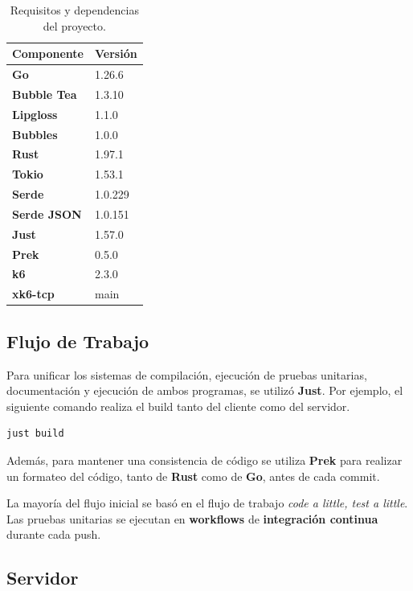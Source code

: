 \begin{table}[h]
    \centering
    \begin{tabular}{ll}
        \textbf{Componente} & \textbf{Versión} \\ \hline
        \textbf{Go} & 1.26.6 \\
        \textbf{Bubble Tea} & 1.3.10 \\
        \textbf{Lipgloss} & 1.1.0 \\
        \textbf{Bubbles} & 1.0.0 \\
        \textbf{Rust} & 1.97.1 \\
        \textbf{Tokio} & 1.53.1 \\
        \textbf{Serde} & 1.0.229 \\
        \textbf{Serde JSON} & 1.0.151 \\
        \textbf{Just} & 1.57.0 \\
        \textbf{Prek} & 0.5.0 \\
        \textbf{k6} & 2.3.0 \\
        \textbf{xk6-tcp} & main \\
    \end{tabular}
    \caption{Requisitos y dependencias del proyecto.}
    \label{tab:requisitos}
\end{table}

\subsection*{Flujo de Trabajo}

Para unificar los sistemas de compilación, ejecución de pruebas unitarias, documentación y ejecución de ambos
programas, se utilizó \textbf{Just}. Por ejemplo, el siguiente comando realiza el build tanto del cliente como del servidor.

\begin{lstlisting}[language=bash]
    just build
\end{lstlisting}

Además, para mantener una consistencia de código se utiliza \textbf{Prek} para realizar un formateo del código,
tanto de \textbf{Rust} como de \textbf{Go}, antes de cada commit.

La mayoría del flujo inicial se basó en el flujo de trabajo \textit{code a little, test a little}. Las pruebas unitarias
se ejecutan en \textbf{workflows} de \textbf{integración continua} durante cada push.

\subsection*{Servidor}

